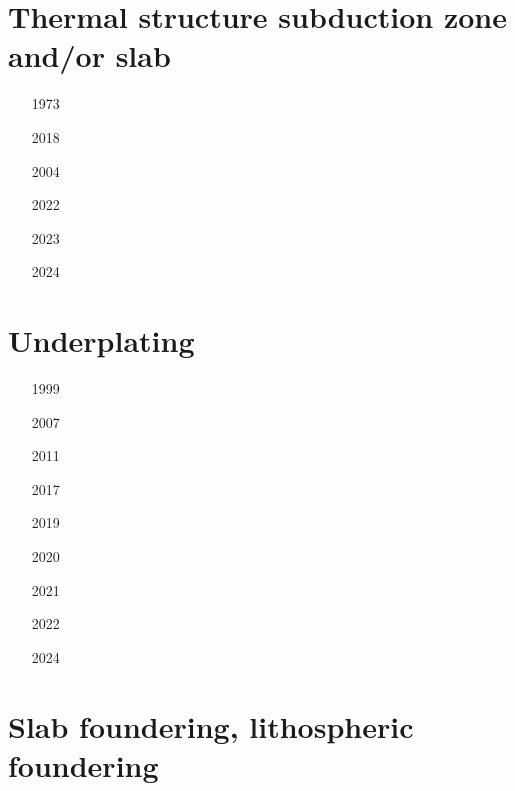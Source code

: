 \section{Thermal structure subduction zone and/or slab}

\begin{small}
\begin{itemize}
\item[1973] 
\item[2018]  
\item[2004] 
\item[2022] 
\item[2023]  
\item[2024]  
\end{itemize}
\end{small}

\section{Underplating}

\begin{small}
\begin{itemize}
\item[1999] 
\item[2007] 
\item[2011] 
\item[2017] 
\item[2019] 
\item[2020] 
\item[2021] 
\item[2022] 
\item[2024] 
\end{itemize}
\end{small}


\section{Slab foundering, lithospheric foundering}

\begin{small}
\begin{itemize}
\item[\twothousand]
\item[\twothousandtwentythree]
 \\
\end{itemize}
\end{small}

